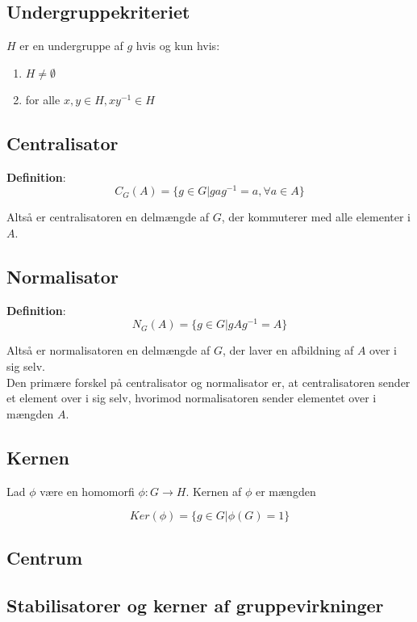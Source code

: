 \documentclass[11pt]{article}
\begin{document}
\subsection*{Undergruppekriteriet}

$H$ er en undergruppe af $g$ hvis og kun hvis:
\begin{enumerate}
  \item $H \neq \emptyset$\\
  \item for alle $x, y \in H, x y^{-1} \in H$
\end{enumerate}

\subsection*{Centralisator}
\textbf{Definition}:\\
$$C_G(A) = \{ g \in G | g a g^{-1} = a,  \forall{a} \in A \}$$

Altså er centralisatoren en delmængde af $G$, der kommuterer med alle elementer i $A$.\\

\subsection*{Normalisator}
\textbf{Definition}:\\
$$N_G(A) = \{ g \in G | gAg^{-1} = A\}$$

Altså er normalisatoren en delmængde af $G$, der laver en afbildning af $A$ over i sig selv.\\

Den primære forskel på centralisator og normalisator er, at centralisatoren sender et element over i sig selv, hvorimod normalisatoren sender elementet over i mængden $A$.




\subsection*{Kernen}
Lad $\phi$ være en homomorfi $\phi : G \to H$. Kernen af $\phi$ er mængden

$$Ker(\phi) = \{ g \in G | \phi(G) = 1 \}$$

\subsection*{Centrum}


\subsection*{Stabilisatorer og kerner af gruppevirkninger}
\end{document}
